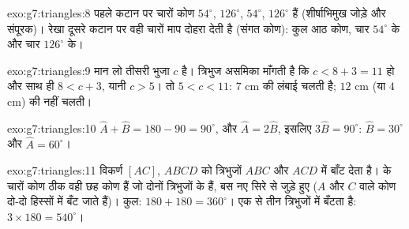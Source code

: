 \begin{solution}{exo:g7:triangles:8}
पहले कटान पर चारों कोण $54^\circ$, $126^\circ$, $54^\circ$,
$126^\circ$ हैं (शीर्षाभिमुख जोड़े और संपूरक)।  रेखा दूसरे
कटान पर वही चारों माप दोहरा देती है (संगत कोण): कुल आठ कोण, चार
$54^\circ$ के और चार $126^\circ$ के।
\end{solution}

\begin{solution}{exo:g7:triangles:9}
मान लो तीसरी भुजा $c$ है। त्रिभुज असमिका माँगती है कि
$c < 8 + 3 = 11$ हो और साथ ही $8 < c + 3$, यानी $c > 5$। तो
$5 < c < 11$: $7$ cm की लंबाई चलती है; $12$ cm (या $4$ cm) की
नहीं चलती।
\end{solution}

\begin{solution}{exo:g7:triangles:10}
$\widehat A + \widehat B = 180 - 90 = 90^\circ$, और
$\widehat A = 2\widehat B$, इसलिए $3\widehat B = 90^\circ$:
$\widehat B = 30^\circ$ और $\widehat A = 60^\circ$।
\end{solution}

\begin{solution}{exo:g7:triangles:11}
विकर्ण $[AC]$, $ABCD$ को त्रिभुजों $ABC$ और $ACD$ में बाँट देता है।
 के चारों कोण ठीक वही छह कोण हैं जो दोनों त्रिभुजों के हैं,
बस नए सिरे से जुड़े हुए ($A$ और $C$ वाले कोण दो-दो हिस्सों में बँट
जाते हैं)। कुल: $180 + 180 = 360^\circ$।  एक  से तीन
त्रिभुजों में बँटता है: $3 \times 180 = 540^\circ$।
\end{solution}


